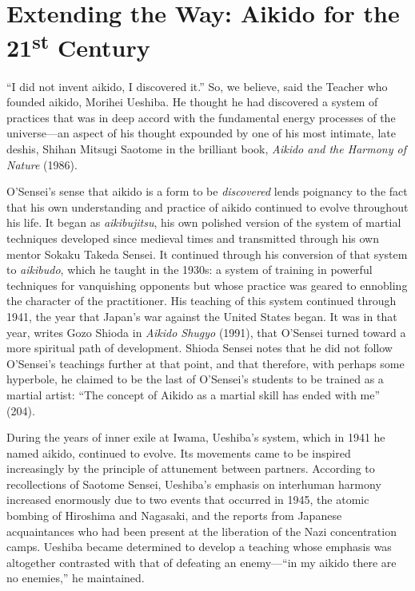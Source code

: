 \chapter[Extending the Way (2009)]{Extending the Way: Aikido for the 21\textsuperscript{st} Century}

``I did not invent aikido, I discovered it.'' So, we believe, said the Teacher who founded aikido, Morihei Ueshiba. He thought he had discovered a system of practices that was in deep accord with the fundamental energy processes of the universe---an aspect of his thought expounded by one of his most intimate, late deshis, Shihan Mitsugi Saotome in the brilliant book, \emph{Aikido and the Harmony of Nature} (1986). 

O'Sensei's sense that aikido is a form to be \emph{discovered} lends poignancy to the fact that his own understanding and practice of aikido continued to evolve throughout his life. It began as \emph{aikibujitsu}, his own polished version of the system of martial techniques developed since medieval times and transmitted through his own mentor Sokaku Takeda Sensei. It continued through his conversion of that system to \emph{aikibudo}, which he taught in the 1930s: a system of training in powerful techniques for vanquishing opponents but whose practice was geared to ennobling the character of the practitioner. His teaching of this system continued through 1941, the year that Japan's war against the United States began. It was in that year, writes Gozo Shioda in \emph{Aikido Shugyo} (1991), that O'Sensei turned toward a more spiritual path of development. Shioda Sensei notes that he did not follow O'Sensei's teachings further at that point, and that therefore, with perhaps some hyperbole, he claimed to be the last of O'Sensei's students to be trained as a martial artist: ``The concept of Aikido as a martial skill has ended with me'' (204). 

During the years of inner exile at Iwama, Ueshiba's system, which in 1941 he named aikido, continued to evolve. Its movements came to be inspired increasingly by the principle of attunement between partners. According to recollections of Saotome Sensei, Ueshiba's emphasis on interhuman harmony increased enormously due to two events that occurred in 1945, the atomic bombing of Hiroshima and Nagasaki, and the reports from Japanese acquaintances who had been present at the liberation of the Nazi concentration camps. Ueshiba became determined to develop a teaching whose emphasis was altogether contrasted with that of defeating an enemy---``in my aikido there are no enemies,'' he maintained. 

